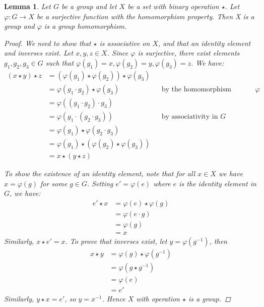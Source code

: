 \documentclass[12pt,letterpaper,DIV=11,final]{scrartcl}
\theoremstyle{plain}
\newtheorem{lemma}[theorem]{Lemma}
\theoremstyle{definition}
\theoremstyle{remark}
\begin{document}
\begin{lemma}
  Let $G$ be a group and let $X$ be a set with binary operation $\star$.
  Let $\varphi : G \to X$ be a surjective function with the homomorphism property.
  Then X is a group and $\varphi$ is a group homomorphism.

  \begin{proof}
    We need to show that $\star$ is associative on $X$, and that an identity element and inverses exist.
    Let $x, y, z \in X$.
    Since $\varphi$ is surjective, there exist elements $g_1, g_2, g_3 \in G$ such that $\varphi(g_1) = x, \varphi(g_2) = y, \varphi(g_3) = z$.
    We have:
    \begin{align*}
      (x \star y) \star z &= (\varphi(g_1) \star \varphi(g_2)) \star \varphi(g_3) \\
                          &= \varphi(g_1 \cdot g_2) \star \varphi(g_3) && \text{by the homomorphism property of $\varphi$} \\
                          &= \varphi ( (g_1 \cdot g_2) \cdot g_3 ) \\
                          &= \varphi ( g_1 \cdot (g_2 \cdot g_3 ) ) && \text{by associativity in $G$} \\
                          &= \varphi(g_1) \star \varphi(g_2 \cdot g_3) \\
                          &= \varphi(g_1) \star (\varphi(g_2) \star \varphi(g_3)) \\
                          &= x \star (y \star z)
    \end{align*}

    To show the existence of an identity element, note that for all $x \in X$ we have $x = \varphi(g)$ for some $g \in G$.
    Setting $e' = \varphi(e)$ where $e$ is the identity element in $G$, we have:
    \begin{align*}
      e' \star x &= \varphi(e) \star \varphi(g) \\
                 &= \varphi(e \cdot g) \\
                 &= \varphi(g) \\
                 &= x
    \end{align*}
    Similarly, $x \star e' = x$.
    To prove that inverses exist, let $y = \varphi(g^{-1})$, then
    \begin{align*}
      x \star y &= \varphi(g) \star \varphi(g^{-1}) \\
                &= \varphi(g \star g^{-1}) \\
                &= \varphi(e) \\
                &= e'
    \end{align*}
    Similarly, $y \star x = e'$, so $y = x^{-1}$.
    Hence $X$ with operation $\star$ is a group.
  \end{proof}
\end{lemma}
\end{document}
